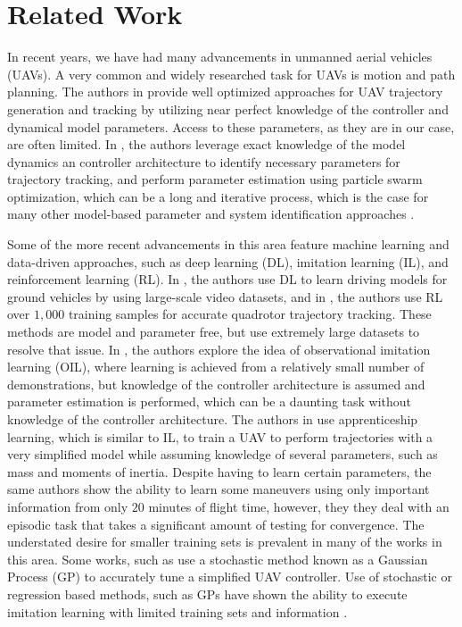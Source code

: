 \documentclass[letterpaper, 10 pt, conference]{ieeeconf}  %
\newcommand\NB[1]{$\spadesuit$\footnote{NB: #1}}
\begin{document}
\section{Related Work} \label{sec:relatedwork}

In recent years, we have had many advancements in unmanned aerial vehicles (UAVs). A very common and widely researched task for UAVs is motion and path planning. The authors in \cite{minsnap,waypts,tvec} provide well optimized approaches for UAV trajectory generation and tracking by utilizing near perfect knowledge of the controller and dynamical model parameters. Access to these parameters, as they are in our case, are often limited. In \cite{pso}, the authors leverage exact knowledge of the model dynamics an controller architecture to identify necessary parameters for trajectory tracking, and perform parameter estimation using particle swarm optimization, which can be a long and iterative process, which is the case for many other model-based parameter and system identification approaches \cite{modelbased1,modelbased2}.

Some of the more recent advancements in this area feature machine learning and data-driven approaches, such as deep learning (DL), imitation learning (IL), and reinforcement learning (RL). In \cite{dln}, the authors use DL to learn driving models for ground vehicles by using large-scale video datasets, and in \cite{rlctrl}, the authors use RL over $1,000$ training samples for accurate quadrotor trajectory tracking. These methods are model and parameter free, but use extremely large datasets to resolve that issue. In \cite{uavrace}, the authors explore the idea of observational imitation learning (OIL), where learning is achieved from a relatively small number of demonstrations, but knowledge of the controller architecture is assumed and parameter estimation is performed, which can be a daunting task without knowledge of the controller architecture. The authors in \cite{abbeel} use apprenticeship learning, which is similar to IL, to train a UAV to perform trajectories with a very simplified model while assuming knowledge of several parameters, such as mass and moments of inertia. Despite having to learn certain parameters, the same authors show the ability to learn some maneuvers using only important information from only $20$ minutes of flight time, however, they they deal with an episodic task that takes a significant amount of testing for convergence. The understated desire for smaller training sets is prevalent in many of the works in this area. Some works, such as \cite{gppaper} use a stochastic method known as a Gaussian Process (GP) to accurately tune a simplified UAV controller. Use of stochastic or regression based methods, such as GPs have shown the ability to execute imitation learning with limited training sets and information \cite{imlerngp,imlernreg}.
\end{document}
